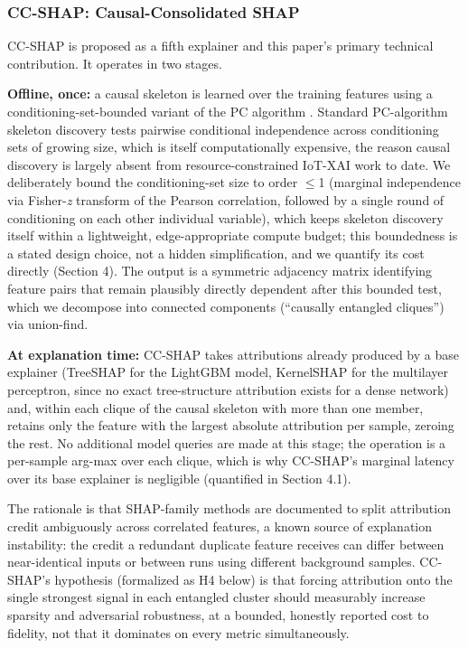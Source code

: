 \subsubsection{CC-SHAP: Causal-Consolidated SHAP}\label{cc-shap-causal-consolidated-shap}

CC-SHAP is proposed as a fifth explainer and this paper's primary technical contribution. It operates in two stages.

\textbf{Offline, once:} a causal skeleton is learned over the training features using a conditioning-set-bounded variant of the PC algorithm \citep{ref24}. Standard PC-algorithm skeleton discovery tests pairwise conditional independence across conditioning sets of growing size, which is itself computationally expensive, the reason causal discovery is largely absent from resource-constrained IoT-XAI work to date. We deliberately bound the conditioning-set size to order $\leq$1 (marginal independence via Fisher-\emph{z} transform of the Pearson correlation, followed by a single round of conditioning on each other individual variable), which keeps skeleton discovery itself within a lightweight, edge-appropriate compute budget; this boundedness is a stated design choice, not a hidden simplification, and we quantify its cost directly (Section 4). The output is a symmetric adjacency matrix identifying feature pairs that remain plausibly directly dependent after this bounded test, which we decompose into connected components (``causally entangled cliques'') via union-find.

\textbf{At explanation time:} CC-SHAP takes attributions already produced by a base explainer (TreeSHAP for the LightGBM model, KernelSHAP for the multilayer perceptron, since no exact tree-structure attribution exists for a dense network) and, within each clique of the causal skeleton with more than one member, retains only the feature with the largest absolute attribution per sample, zeroing the rest. No additional model queries are made at this stage; the operation is a per-sample arg-max over each clique, which is why CC-SHAP's marginal latency over its base explainer is negligible (quantified in Section 4.1).

The rationale is that SHAP-family methods are documented to split attribution credit ambiguously across correlated features, a known source of explanation instability: the credit a redundant duplicate feature receives can differ between near-identical inputs or between runs using different background samples. CC-SHAP's hypothesis (formalized as H4 below) is that forcing attribution onto the single strongest signal in each entangled cluster should measurably increase sparsity and adversarial robustness, at a bounded, honestly reported cost to fidelity, not that it dominates on every metric simultaneously.

